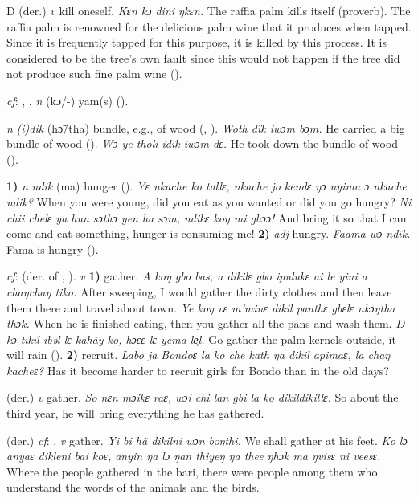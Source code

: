 \begin{letter}{D}
 (der.) \textit{v} kill oneself. \textit{Kɛn kɔ dini ŋkɛn.} The raffia palm kills itself (proverb). The raffia palm is renowned for the delicious palm wine that it produces when tapped. Since it is frequently tapped for this purpose, it is killed by this process. It is considered to be the tree's own fault since this would not happen if the tree did not produce such fine palm wine (\citealt{TISLL1979}).

 \textit{cf}: , . \textit{n} (kɔ/-) yam(s) (\citealt{Pichl1967}).

 \textit{n} \textit{(i)dik} (hɔ̃/tha) bundle, e.g., of wood (\citealt{Pichl1967}, \citealt{Sumner1921}). \textit{Woth dïk iwɔm bo̹m.} He carried a big bundle of wood (\citealt{Pichl1967}). \textit{Wɔ ye tholi idïk iwɔm dɛ.} He took down the bundle of wood (\citealt{Pichl1967}). 

 \textbf{1)} \textit{n} \textit{ndik} (ma) hunger (\citealt{Pichl1967}). \textit{Yɛ nkache ko tallɛ, nkache jo kendɛ ŋɔ nyima ɔ nkache ndik?} When you were young, did you eat as you wanted or did you go hungry? \textit{Ni chii chelɛ ya hun sɔthɔ yen ha sɔm, ndikɛ koŋ mi gbɔɔ!} And bring it so that I can come and eat something, hunger is consuming me! \textbf{2)} \textit{adj} hungry. \textit{Faama wɔ ndïk.} Fama is hungry (\citealt{Pichl1967}). 

 \textit{cf}:  (der. of , ). \textit{v} \textbf{1)} gather. \textit{A koŋ gbo bas, a dikilɛ gbo ipulukɛ ai le yini a chaŋchaŋ tiko.} After sweeping, I would gather the dirty clothes and then leave them there and travel about town. \textit{Ye koŋ vɛ m'minɛ dikil panthɛ gbɛlɛ nkɔŋtha thɔk.} When he is finished eating, then you gather all the pans and wash them. \textit{Ŋ kɔ tïkïl ibəl lɛ kahãy ko, hɔɛɛ lɛ yema le̹l.} Go gather the palm kernels outside, it will rain (\citealt{Pichl1967}). \textbf{2)} recruit. \textit{Labo ja Bondoɛ la ko che kath ŋa dikil apimaɛ, la chaŋ kacheɛ?} Has it become harder to recruit girls for Bondo than in the old days?

 (der.) \textit{v} gather. \textit{So nɛn mɔikɛ raɛ, wɔi chi lan gbi la ko dikildikillɛ.} So about the third year, he will bring everything he has gathered.

 (der.) \textit{cf}: . \textit{v} gather. \textit{Yi bi hã dikilni wɔn bəŋthi.} We shall gather at his feet. \textit{Ko lɔ anyaɛ dikleni bai koɛ, anyin ŋa lɔ ŋan thiyeŋ ŋa thee ŋhɔk ma ŋvisɛ ni veesɛ.} Where the people gathered in the bari, there were people among them who understand the words of the animals and the birds.


\end{letter}
